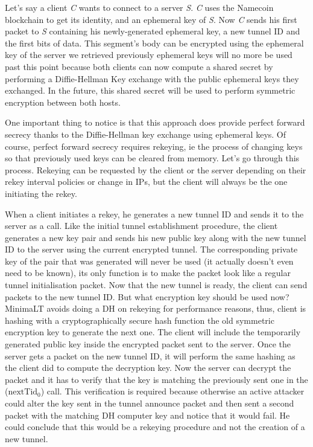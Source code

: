 \documentclass{vldb}
\begin{document}
Let's say a client \emph{C} wants to connect to a server \emph{S}. \emph{C} uses the Namecoin blockchain to get its identity, and an ephemeral key of \emph{S}. Now \emph{C} sends his first packet to \emph{S} containing his newly-generated ephemeral key, a new tunnel ID and the first bits of data. This segment's body can be encrypted using the ephemeral key of the server we retrieved previously ephemeral keys will no more be used past this point because both clients can now compute a shared secret by performing a Diffie-Hellman Key exchange with the public ephemeral keys they exchanged. In the future, this shared secret will be used to perform symmetric encryption between both hosts.

One important thing to notice is that this approach does provide perfect forward secrecy thanks to the Diffie-Hellman key exchange using ephemeral keys. Of course, perfect forward secrecy requires rekeying, ie the process of changing keys so that previously used keys can be cleared from memory. Let's go through this process. Rekeying can be requested by the client or the server depending on their rekey interval policies or change in IPs, but the client will always be the one initiating the rekey.

When a client initiates a rekey, he generates a new tunnel ID and sends it to the server as a call. Like the initial tunnel establishment procedure, the client generates a new key pair and sends his new public key along with the new tunnel ID to the server using the current encrypted tunnel. The corresponding private key of the pair that was generated will never be used (it actually doesn't even need to be known), its only function is to make the packet look like a regular tunnel initialisation packet. Now that the new tunnel is ready, the client can send packets to the new tunnel ID. But what encryption key should be used now? MinimaLT avoids doing a DH on rekeying for performance reasons, thus, client is hashing with a cryptographically secure hash function the old symmetric encryption key to generate the next one. The client will include the temporarily generated public key inside the encrypted packet sent to the server. Once the server gets a packet on the new tunnel ID, it will perform the same hashing as the client did to compute the decryption key. Now the server can decrypt the packet and it has to verify that the key is matching the previously sent one in the (\emph{$\text{nextTid}_{0}$}) call. This verification is required\cite{MinimaLT} because otherwise an active attacker could alter the key sent in the tunnel announce packet and then sent a second packet with the matching DH computer key and notice that it would fail. He could conclude that this would be a rekeying procedure and not the creation of a new tunnel.
\end{document}
